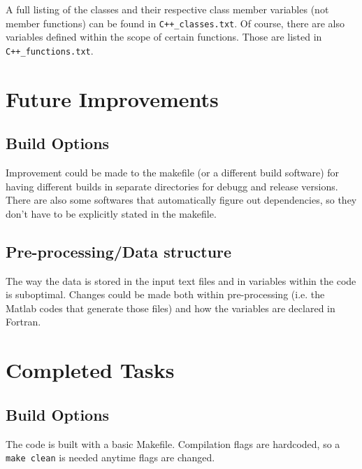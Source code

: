 \documentclass[12pt]{article}
\begin{document}
    A full listing of the classes and their respective class member variables (not member functions) can be found in \texttt{C++\_classes.txt}. Of course, there are also variables defined within the scope of certain functions. Those are listed in \texttt{C++\_functions.txt}.
    
    \newpage
    \section{Future Improvements}
    \subsection{Build Options}
    Improvement could be made to the makefile (or a different build software) for having different builds in separate directories for debugg and release versions. There are also some softwares that automatically figure out dependencies, so they don't have to be explicitly stated in the makefile.

    \subsection{Pre-processing/Data structure}
    The way the data is stored in the input text files and in variables within the code is suboptimal. Changes could be made both within pre-processing (i.e. the Matlab codes that generate those files) and how the variables are declared in Fortran.

    \newpage
    \section{Completed Tasks}

    \subsection{Build Options}
    The code is built with a basic Makefile. Compilation flags are hardcoded, so a \texttt{make clean} is needed anytime flags are changed.
\end{document}
